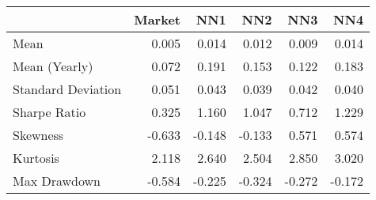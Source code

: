 \begin{tabular}{lrrrrr}
\toprule
{} &  Market &    NN1 &    NN2 &    NN3 &    NN4 \\
\midrule
Mean               &   0.005 &  0.014 &  0.012 &  0.009 &  0.014 \\
Mean (Yearly)      &   0.072 &  0.191 &  0.153 &  0.122 &  0.183 \\
Standard Deviation &   0.051 &  0.043 &  0.039 &  0.042 &  0.040 \\
Sharpe Ratio       &   0.325 &  1.160 &  1.047 &  0.712 &  1.229 \\
Skewness           &  -0.633 & -0.148 & -0.133 &  0.571 &  0.574 \\
Kurtosis           &   2.118 &  2.640 &  2.504 &  2.850 &  3.020 \\
Max Drawdown       &  -0.584 & -0.225 & -0.324 & -0.272 & -0.172 \\
\bottomrule
\end{tabular}
